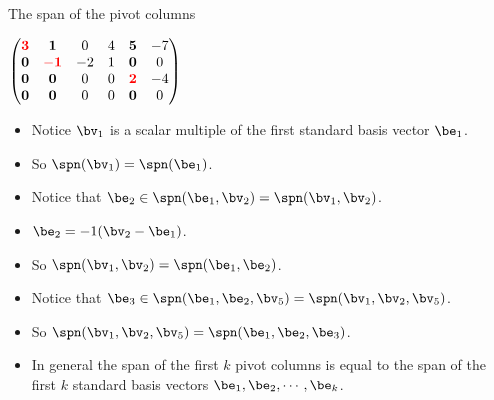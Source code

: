 \documentclass{beamer}
\begin{document}

\begin{frame}{The span of the pivot columns}

$
\begin{pmatrix}
\textcolor{red}{\mathbf{3}} & \mathbf{1}                   &  0  & 4 & \mathbf{5}                  & -7 \\
\mathbf{0}                  & \textcolor{red}{\mathbf{-1}} & -2  & 1 & \mathbf{0}                  & 0  \\
\mathbf{0}                  & \mathbf{0}                   &  0  & 0 & \textcolor{red}{\mathbf{2}} & -4 \\
\mathbf{0}                  & \mathbf{0}                   &  0  & 0 & \mathbf{0}                  & 0  \\
\end{pmatrix}
$
\begin{itemize}
\item Notice $\bv_1$ is a scalar multiple of the first standard basis vector $\be_1$.
\item So $\spn(\bv_1) = \spn(\be_1)$.
\item Notice that $\be_2\in\spn(\be_1,\bv_2)=\spn(\bv_1,\bv_2)$.
\item $\be_2 = -1(\bv_2 - \be_1)$.
\item So $\spn(\bv_1,\bv_2) = \spn(\be_1,\be_2)$.
\item Notice that $\be_3\in\spn(\be_1,\be_2,\bv_5)=\spn(\bv_1,\bv_2,\bv_5)$.
\item So $\spn(\bv_1,\bv_2,\bv_5) = \spn(\be_1,\be_2,\be_3)$.
\item In general the span of the first $k$ pivot columns is equal to the
span of the first $k$ standard basis vectors $\be_1,\be_2,\cdots,\be_k$.
\end{itemize}

\end{frame}

\end{document}
